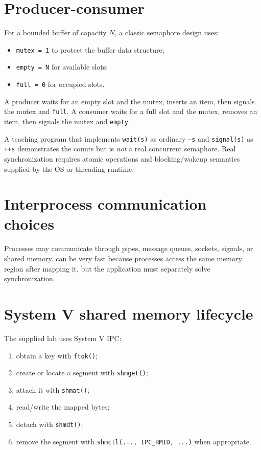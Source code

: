 \section{Producer-consumer}
For a bounded buffer of capacity $N$, a classic semaphore design uses:
\begin{itemize}
  \item \texttt{mutex = 1} to protect the buffer data structure;
  \item \texttt{empty = N} for available slots;
  \item \texttt{full = 0} for occupied slots.
\end{itemize}
A producer waits for an empty slot and the mutex, inserts an item, then signals the mutex and \texttt{full}. A consumer waits for a full slot and the mutex, removes an item, then signals the mutex and \texttt{empty}.

\begin{pitfall}
A teaching program that implements \texttt{wait(s)} as ordinary \texttt{--s} and \texttt{signal(s)} as \texttt{++s} demonstrates the counts but is \emph{not} a real concurrent semaphore. Real synchronization requires atomic operations and blocking/wakeup semantics supplied by the OS or threading runtime.
\end{pitfall}

\section{Interprocess communication choices}
Processes may communicate through pipes, message queues, sockets, signals, or shared memory.  can be very fast because processes access the same memory region after mapping it, but the application must separately solve synchronization.

\section{System V shared memory lifecycle}
The supplied lab uses System V IPC:
\begin{enumerate}
  \item obtain a key with \texttt{ftok()};
  \item create or locate a segment with \texttt{shmget()};
  \item attach it with \texttt{shmat()};
  \item read/write the mapped bytes;
  \item detach with \texttt{shmdt()};
  \item remove the segment with \texttt{shmctl(..., IPC\_RMID, ...)} when appropriate.
\end{enumerate}


